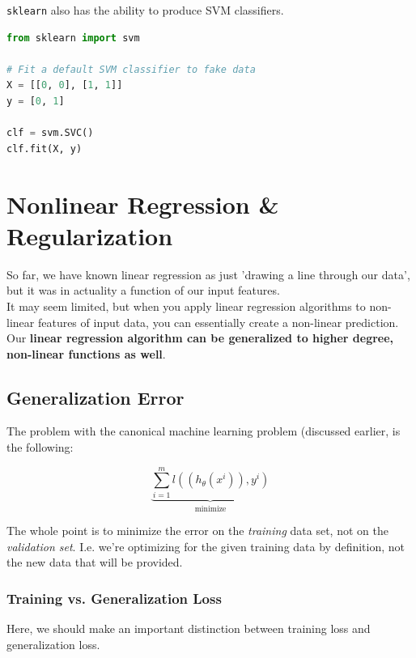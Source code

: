 \documentclass[english, 10pt]{article}
\begin{document}
\texttt{sklearn} also has the ability to produce SVM classifiers.\\


{\centering
\begin{lstlisting}[language=python]
from sklearn import svm

# Fit a default SVM classifier to fake data
X = [[0, 0], [1, 1]]
y = [0, 1]

clf = svm.SVC()
clf.fit(X, y)
\end{lstlisting}
}

\section{Nonlinear Regression \& Regularization}

So far, we have known linear regression as just 'drawing a line through our data', but it was in actuality a function of our input features.\\

It may seem limited, but when you apply linear regression algorithms to non-linear features of input data, you can essentially create a non-linear prediction.\\

Our \textbf{linear regression algorithm can be generalized to higher degree, non-linear functions as well}.

\subsection{Generalization Error}

The problem with the canonical machine learning problem (discussed earlier, is the following:

$$ \underbrace{\sum_{i=1}^{m}{l((h_{\theta}(x^i)), y^i)}}_{\mathrm{minimize}}$$

The whole point is to minimize the error on the \textit{training} data set, not on the \textit{validation set}. I.e. we're optimizing for the given training data by definition, not the new data that will be provided.\\

\subsubsection{Training vs. Generalization Loss}

Here, we should make an important distinction between training loss and generalization loss.\\
\end{document}

